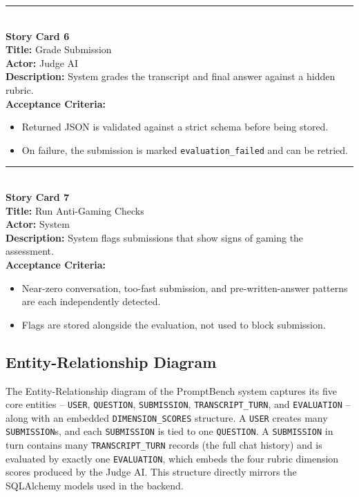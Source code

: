 \documentclass[11pt]{article}
\begin{document}
\noindent\rule{\linewidth}{0.5pt}\\
\textbf{Story Card 6}\\
\textbf{Title:} Grade Submission\\
\textbf{Actor:} Judge AI\\
\textbf{Description:} System grades the transcript and final answer against a hidden rubric.\\
\textbf{Acceptance Criteria:}
\begin{itemize}[nosep]
  \item Returned JSON is validated against a strict schema before being stored.
  \item On failure, the submission is marked \texttt{evaluation\_failed} and can be retried.
\end{itemize}

\noindent\rule{\linewidth}{0.5pt}\\
\textbf{Story Card 7}\\
\textbf{Title:} Run Anti-Gaming Checks\\
\textbf{Actor:} System\\
\textbf{Description:} System flags submissions that show signs of gaming the assessment.\\
\textbf{Acceptance Criteria:}
\begin{itemize}[nosep]
  \item Near-zero conversation, too-fast submission, and pre-written-answer patterns are each independently detected.
  \item Flags are stored alongside the evaluation, not used to block submission.
\end{itemize}

\subsection{Entity-Relationship Diagram}

The Entity-Relationship diagram of the PromptBench system captures its five core entities --
\texttt{USER}, \texttt{QUESTION}, \texttt{SUBMISSION}, \texttt{TRANSCRIPT\_TURN}, and
\texttt{EVALUATION} -- along with an embedded \texttt{DIMENSION\_SCORES} structure. A
\texttt{USER} creates many \texttt{SUBMISSION}s, and each \texttt{SUBMISSION} is tied to
one \texttt{QUESTION}. A \texttt{SUBMISSION} in turn contains many
\texttt{TRANSCRIPT\_TURN} records (the full chat history) and is evaluated by exactly one
\texttt{EVALUATION}, which embeds the four rubric dimension scores produced by the Judge
AI. This structure directly mirrors the SQLAlchemy models used in the backend.
\end{document}
